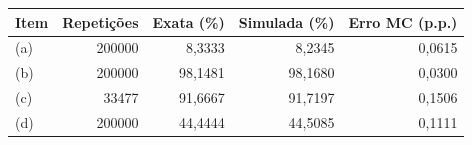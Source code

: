 \begin{tabular}{lrrrr}
\toprule
Item & Repetições & Exata (\%) & Simulada (\%) & Erro MC (p.p.) \\
\midrule
(a) & 200000 & 8,3333 & 8,2345 & 0,0615 \\
(b) & 200000 & 98,1481 & 98,1680 & 0,0300 \\
(c) & 33477 & 91,6667 & 91,7197 & 0,1506 \\
(d) & 200000 & 44,4444 & 44,5085 & 0,1111 \\
\bottomrule
\end{tabular}
